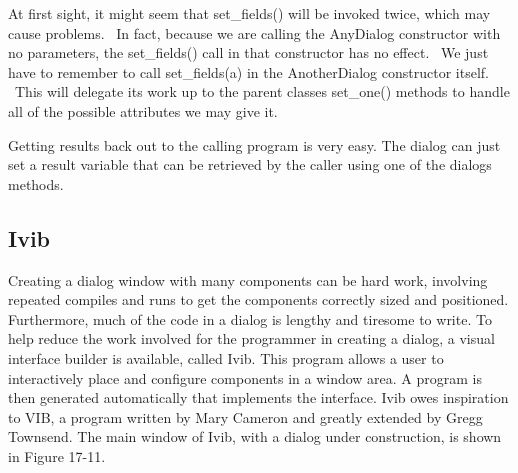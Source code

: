 At first sight, it might seem that \textsf{set\_fields()} will be
invoked twice, which may cause problems. \ In fact, because we are
calling the \textsf{AnyDialog} constructor with no parameters, the
\textsf{set\_fields()} call in that constructor has no effect. \ We
just have to remember to call \textsf{set\_fields(a)} in the
\textsf{AnotherDialog} constructor itself. \ This will delegate its
work up to the parent classes{\textquotesingle} \textsf{set\_one()}
methods to handle all of the possible attributes we may give it.

Getting results back out to the calling program is very easy. The dialog
can just set a result variable that can be retrieved by
the caller using one of the dialog{\textquotesingle}s methods.

\subsection[Ivib]{Ivib}
Creating a dialog window with many components can be hard
work, involving repeated compiles and runs to get the components
correctly sized and positioned. Furthermore, much of the code in a
dialog is lengthy and tiresome to write. To help reduce the work
involved for the programmer in creating a dialog, a visual
interface builder is available, called Ivib.
This program allows a user to interactively place and configure
components in a window area. A program is then generated automatically
that implements the interface. Ivib owes inspiration to VIB, a program
written by Mary Cameron and greatly extended by
Gregg Townsend. The main window of Ivib, with a
dialog under construction, is shown in Figure 17-11.



